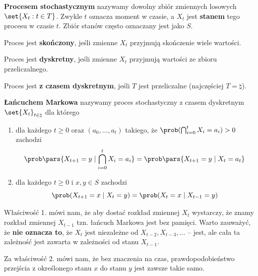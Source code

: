 \begin{definition}
	\label{stochastic-process-definition}
	\textbf{Procesem stochastycznym} nazywamy dowolny zbiór zmiennych losowych \(\set{X_t : t \in T}\).
	Zwykle \(t\) oznacza moment w czasie, a \(X_t\) jest \textbf{stanem} tego procesu w czasie \(t\). Zbiór stanów często oznaczany jest jako \(S\).
\end{definition}

\begin{definition}
	Proces jest \textbf{skończony}, jeśli zmienne \(X_t\) przyjmują skończenie wiele wartości.
\end{definition}

\begin{definition}
	Proces jest \textbf{dyskretny}, jeśli zmienne \(X_t\) przyjmują wartości ze zbioru przeliczalnego.
\end{definition}

\begin{definition}
	Proces jest \textbf{z czasem dyskretnym}, jeśli \(T\) jest przeliczalne (najczęściej \(T = \natural\)).
\end{definition}

\begin{definition}
	\textbf{Łańcuchem Markowa} nazywamy proces stochastyczny z czasem dyskretnym \(\set{X_t}_{t \in \natural}\) dla którego

	\begin{enumerate}
		\item dla każdego \(t \geq 0\) oraz \((a_0, \dots, a_t)\) takiego, że \(\prob(\bigcap_{i=0}^t X_i = a_i) > 0\) zachodzi
		      \[
			      \prob\pars{X_{t + 1} = y \mid \bigcap_{i=0}^t X_i = a_i} = \prob\pars{X_{t + 1} = y \mid X_t = a_t}
		      \]
		\item dla każdego \(t \geq 0\) i \(x, y \in S\) zachodzi
		      \[
			      \prob(X_{t+1} = x \mid X_t = y) = \prob(X_t = x \mid X_{t-1} = y)
		      \]
	\end{enumerate}
\end{definition}

Właściwość 1. mówi nam, że aby dostać rozkład zmiennej \(X_t\) wystarczy, że znamy rozkład zmiennej \(X_{t-1}\) tzn. łańcuch Markowa jest bez pamięci. Warto zauważyć, że \textbf{nie oznacza to}, że \(X_t\) jest niezależne od \(X_{t-2}, X_{t-3}, \dots\) -- jest, ale cała ta zależność jest zawarta w zależności od stanu \(X_{t-1}\).

Za właściwość 2. mówi nam, że bez znaczenia na czas, prawdopodobieństwo przejścia z określonego stanu \(x\) do stanu \(y\) jest zawsze takie samo.

